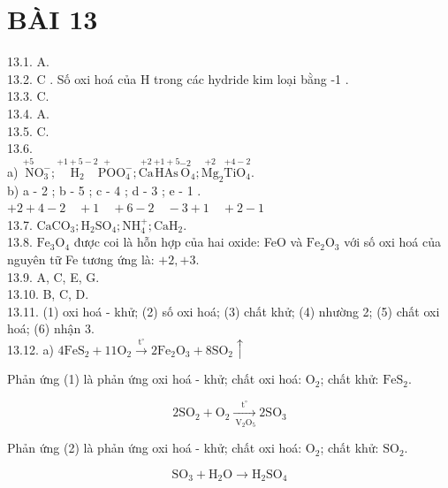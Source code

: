 \documentclass[10pt]{article}
\begin{document}
\section*{BÀI 13}
13.1. A.\\
13.2. C . Số oxi hoá của H trong các hydride kim loại bằng -1 .\\
13.3. C.\\
13.4. A.\\
13.5. C.\\
13.6.\\
a) $\stackrel{+5}{\mathrm{~N}} \mathrm{O}_{3}^{-} ; \stackrel{+1+5-2}{\mathrm{H}_{2}} \stackrel{+}{\mathrm{PO}} \mathrm{O}_{4}^{-} ; \stackrel{+2}{\mathrm{Ca}} \stackrel{+1+5}{\mathrm{HAs}} \stackrel{-2}{\mathrm{O}}_{4} ; \stackrel{+2}{\mathrm{Mg}}_{2} \stackrel{+4-2}{\mathrm{TiO}_{4}}$.\\
b) a - 2 ; b - 5 ; c - 4 ; d - 3 ; e - 1 .\\
$+2+4-2 \quad+1 \quad+6-2 \quad-3+1 \quad+2-1$\\
13.7. $\mathrm{CaCO}_{3} ; \mathrm{H}_{2} \mathrm{SO}_{4} ; \mathrm{NH}_{4}^{+} ; \mathrm{CaH}_{2}$.\\
13.8. $\mathrm{Fe}_{3} \mathrm{O}_{4}$ được coi là hỗn hợp của hai oxide: FeO và $\mathrm{Fe}_{2} \mathrm{O}_{3}$ với số oxi hoá của nguyên tữ Fe tương ứng là: $+2,+3$.\\
13.9. A, C, E, G.\\
13.10. B, C, D.\\
13.11. (1) oxi hoá - khử; (2) số oxi hoá; (3) chất khử; (4) nhường 2; (5) chất oxi hoá; (6) nhận 3.\\
13.12. a) $4 \mathrm{FeS}_{2}+11 \mathrm{O}_{2} \xrightarrow{\mathrm{t}^{\circ}} 2 \mathrm{Fe}_{2} \mathrm{O}_{3}+8 \mathrm{SO}_{2} \uparrow$

Phản ứng (1) là phản ứng oxi hoá - khử; chất oxi hoá: $\mathrm{O}_{2}$; chất khử: $\mathrm{FeS}_{2}$.


\begin{equation*}
2 \mathrm{SO}_{2}+\mathrm{O}_{2} \xrightarrow[\mathrm{~V}_{2} \mathrm{O}_{5}]{\mathrm{t}^{\circ}} 2 \mathrm{SO}_{3} \tag{2}
\end{equation*}


Phản ứng (2) là phản ứng oxi hoá - khử; chất oxi hoá: $\mathrm{O}_{2}$; chất khử: $\mathrm{SO}_{2}$.


\begin{equation*}
\mathrm{SO}_{3}+\mathrm{H}_{2} \mathrm{O} \rightarrow \mathrm{H}_{2} \mathrm{SO}_{4} \tag{3}
\end{equation*}
\end{document}
